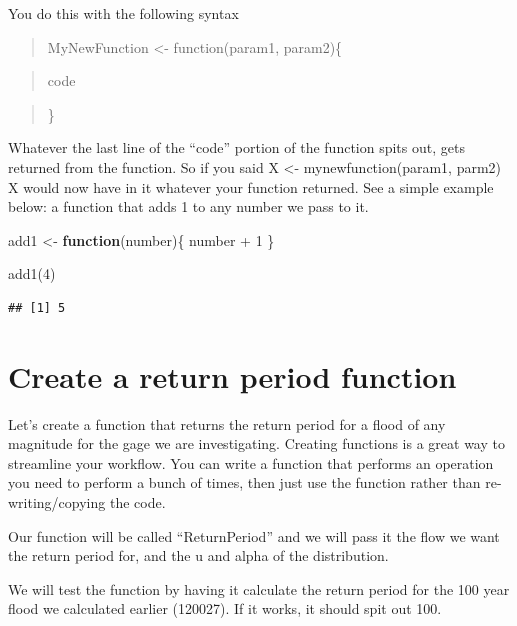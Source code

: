 \documentclass[
]{book}
\newenvironment{Shaded}{\begin{snugshade}}{\end{snugshade}}
\newcommand{\ControlFlowTok}[1]{\textcolor[rgb]{0.13,0.29,0.53}{\textbf{#1}}}
\newcommand{\DecValTok}[1]{\textcolor[rgb]{0.00,0.00,0.81}{#1}}
\newcommand{\FunctionTok}[1]{\textcolor[rgb]{0.00,0.00,0.00}{#1}}
\newcommand{\NormalTok}[1]{#1}
\newcommand{\OtherTok}[1]{\textcolor[rgb]{0.56,0.35,0.01}{#1}}
\newcommand{\SpecialCharTok}[1]{\textcolor[rgb]{0.00,0.00,0.00}{#1}}
\begin{document}
You do this with the following syntax

\begin{quote}
MyNewFunction \textless- function(param1, param2)\{
\end{quote}

\begin{quote}
code
\end{quote}

\begin{quote}
\}
\end{quote}

Whatever the last line of the ``code'' portion of the function spits out, gets returned from the function. So if you said X \textless- mynewfunction(param1, parm2) X would now have in it whatever your function returned. See a simple example below: a function that adds 1 to any number we pass to it.

\begin{Shaded}
\begin{Highlighting}[]
\NormalTok{add1 }\OtherTok{\textless{}{-}} \ControlFlowTok{function}\NormalTok{(number)\{}
\NormalTok{          number }\SpecialCharTok{+} \DecValTok{1}
\NormalTok{          \}}

\FunctionTok{add1}\NormalTok{(}\DecValTok{4}\NormalTok{)}
\end{Highlighting}
\end{Shaded}

\begin{verbatim}
## [1] 5
\end{verbatim}

\hypertarget{create-a-return-period-function}{%
\section{Create a return period function}\label{create-a-return-period-function}}

Let's create a function that returns the return period for a flood of any magnitude for the gage we are investigating. Creating functions is a great way to streamline your workflow. You can write a function that performs an operation you need to perform a bunch of times, then just use the function rather than re-writing/copying the code.

Our function will be called ``ReturnPeriod'' and we will pass it the flow we want the return period for, and the u and alpha of the distribution.

We will test the function by having it calculate the return period for the 100 year flood we calculated earlier (120027). If it works, it should spit out 100.
\end{document}

